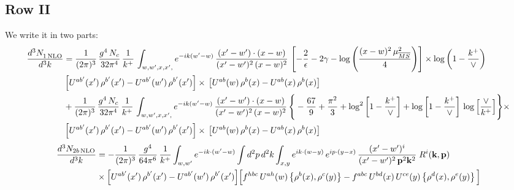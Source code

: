 \documentclass[9pt]{article}
\numberwithin{equation}{section}
\begin{document}
\subsection{Row II}
We write it in two parts:
\begin{align}
     \frac{d^{3}N_{1\,\rm NLO}^{\rm}}{d^{3}k} &  =  \frac{1}{(2\pi)^{3}}\, \frac{g^{4}\,N_{c}}{32\pi^{4}}\,\frac{1}{k^{+}}\, \int_{w, w',x,x',} e^{-ik(w^\prime-w)}\, \frac{(x'-w')\cdot (x-w)}{(x'-w')^{2}\, (x-w)^{2}}\, \left[-\frac{2}{\epsilon}-2\gamma-\log{\left(\frac{(x-w)^{2}\,\mu^{2}_{\overline{MS}}}{4}\right)}\right]\times\log{\left(1-\frac{k^{+}}{\vee}\right)}\notag \\ & \left[U^{ab'}(x')\,\rho^{b'}(x') - U^{ab'}(w')\,\rho^{b'}(x')\right]\times\,\left[U^{ab}(w)\,\rho^{b}(x) - U^{ab}(x)\,\rho^{b}(x)\right]\notag \\ & +\frac{1}{(2\pi)^{3}}\, \frac{g^{4}\,N_{c}}{32\pi^{4}}\,\frac{1}{k^{+}}\, \int_{w, w',x,x',} e^{-ik(w^\prime-w)}\, \frac{(x'-w')\cdot (x-w)}{(x'-w')^{2}\, (x-w)^{2}}\, \Bigg\{ -\frac{67}{9}+\frac{\pi^{2}}{3}+\log^{2}{\left[1-\frac{k^{+}}{\vee}\right]}+\log{\left[1-\frac{k^{+}}{\vee}\right]}\,\log{\left[\frac{\vee}{k^{+}}\right]}\Bigg\}\times\notag \\ & \left[U^{ab'}(x')\,\rho^{b'}(x') - U^{ab'}(w')\,\rho^{b'}(x')\right]\times\,\left[U^{ab}(w)\,\rho^{b}(x) - U^{ab}(x)\,\rho^{b}(x)\right]
\end{align}  
\begin{align}
\frac{d^{3}N_{2b\,\rm NLO}}{d^{3}k} & = -\frac{1}{(2\pi)^{3}}\,\frac{g^{4}}{64\pi^{6}}\,\frac{1}{k^{+}}\int_{w,w'} e^{-ik\cdot(w'-w)}
\int d^{2}p\,d^{2}k\int_{x,y} e^{ik\cdot(w-y)}\,e^{ip\cdot(y-x)}\,\frac{(x'-w')^{i}}{(x'-w')^{2}\,\mathbf{p}^{2}\mathbf{k}^{2}}\;R^{i}(\mathbf{k},\mathbf{p})\notag\\
&\times\Big[U^{ab'}(x')\,\rho^{b'}(x')-U^{ab'}(w')\,\rho^{b'}(x')\Big]
\Big[f^{hbc}\,U^{ah}(w)\left\{\rho^{b}(x),\rho^{c}(y)\right\}-f^{abc}\,U^{bd}(x)\,U^{ce}(y)\left\{\rho^{d}(x),\rho^{e}(y)\right\}\Big]
\end{align}
\end{document}
